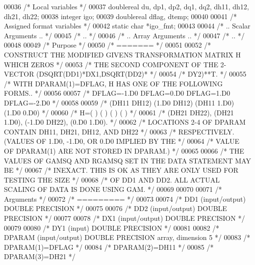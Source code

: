 \begin{DoxyCode}
00036     \textcolor{comment}{/* Local variables */}
00037     doublereal du, dp1, dp2, dq1, dq2, dh11, dh12, dh21, dh22;
00038     integer igo;
00039     doublereal dflag, dtemp;
00040 
00041     \textcolor{comment}{/* Assigned format variables */}
00042     \textcolor{keyword}{static} \textcolor{keywordtype}{char} *igo\_fmt;
00043 
00044 \textcolor{comment}{/*     .. Scalar Arguments .. */}
00045 \textcolor{comment}{/*     .. */}
00046 \textcolor{comment}{/*     .. Array Arguments .. */}
00047 \textcolor{comment}{/*     .. */}
00048 
00049 \textcolor{comment}{/*  Purpose */}
00050 \textcolor{comment}{/*  ======= */}
00051 
00052 \textcolor{comment}{/*     CONSTRUCT THE MODIFIED GIVENS TRANSFORMATION MATRIX H WHICH ZEROS */}
00053 \textcolor{comment}{/*     THE SECOND COMPONENT OF THE 2-VECTOR  (DSQRT(DD1)*DX1,DSQRT(DD2)* */}
00054 \textcolor{comment}{/*     DY2)**T. */}
00055 \textcolor{comment}{/*     WITH DPARAM(1)=DFLAG, H HAS ONE OF THE FOLLOWING FORMS.. */}
00056 
00057 \textcolor{comment}{/*     DFLAG=-1.D0     DFLAG=0.D0        DFLAG=1.D0     DFLAG=-2.D0 */}
00058 
00059 \textcolor{comment}{/*       (DH11  DH12)    (1.D0  DH12)    (DH11  1.D0)    (1.D0  0.D0) */}
00060 \textcolor{comment}{/*     H=(          )    (          )    (          )    (          ) */}
00061 \textcolor{comment}{/*       (DH21  DH22),   (DH21  1.D0),   (-1.D0 DH22),   (0.D0  1.D0). */}
00062 \textcolor{comment}{/*     LOCATIONS 2-4 OF DPARAM CONTAIN DH11, DH21, DH12, AND DH22 */}
00063 \textcolor{comment}{/*     RESPECTIVELY. (VALUES OF 1.D0, -1.D0, OR 0.D0 IMPLIED BY THE */}
00064 \textcolor{comment}{/*     VALUE OF DPARAM(1) ARE NOT STORED IN DPARAM.) */}
00065 
00066 \textcolor{comment}{/*     THE VALUES OF GAMSQ AND RGAMSQ SET IN THE DATA STATEMENT MAY BE */}
00067 \textcolor{comment}{/*     INEXACT.  THIS IS OK AS THEY ARE ONLY USED FOR TESTING THE SIZE */}
00068 \textcolor{comment}{/*     OF DD1 AND DD2.  ALL ACTUAL SCALING OF DATA IS DONE USING GAM. */}
00069 
00070 
00071 \textcolor{comment}{/*  Arguments */}
00072 \textcolor{comment}{/*  ========= */}
00073 
00074 \textcolor{comment}{/*  DD1    (input/output) DOUBLE PRECISION */}
00075 
00076 \textcolor{comment}{/*  DD2    (input/output) DOUBLE PRECISION */}
00077 
00078 \textcolor{comment}{/*  DX1    (input/output) DOUBLE PRECISION */}
00079 
00080 \textcolor{comment}{/*  DY1    (input) DOUBLE PRECISION */}
00081 
00082 \textcolor{comment}{/*  DPARAM (input/output)  DOUBLE PRECISION array, dimension 5 */}
00083 \textcolor{comment}{/*     DPARAM(1)=DFLAG */}
00084 \textcolor{comment}{/*     DPARAM(2)=DH11 */}
00085 \textcolor{comment}{/*     DPARAM(3)=DH21 */}

\end{DoxyCode}
